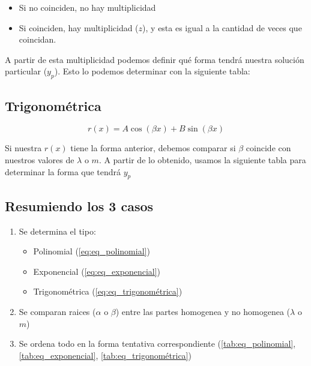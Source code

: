 \begin{itemize}
    \item Si no coinciden, no hay multiplicidad
    \item Si coinciden, hay multiplicidad ($z$), y esta es igual a la cantidad de veces que coincidan. 
\end{itemize}

A partir de esta multiplicidad podemos definir qué forma tendrá nuestra solución particular ($y_{p}$). Esto lo podemos determinar con la siguiente tabla:

    

\subsection{Trigonométrica}

\begin{equation}\label{eq:eq_trigonométrica}
    r(x) = A \cos{(\beta x)} + B \sin{(\beta x)}
\end{equation}

Si nuestra $r(x)$ tiene la forma anterior, debemos comparar si $\beta$ coincide con nuestros valores de $\lambda$ o $m$. A partir de lo obtenido, usamos la siguiente tabla para determinar la forma que tendrá $y_{p}$

    

\subsection{Resumiendo los 3 casos}

\begin{enumerate}
    \item Se determina el tipo:
        \begin{itemize}
            \item Polinomial (\autoref{eq:eq_polinomial})
            \item Exponencial (\autoref{eq:eq_exponencial})
            \item Trigonométrica (\autoref{eq:eq_trigonométrica})
        \end{itemize}
    \item Se comparan raices ($\alpha$ o $\beta$) entre las partes homogenea y no homogenea ($\lambda$ o $m$)
    \item Se ordena todo en la forma tentativa correspondiente (\autoref{tab:eq_polinomial}, \autoref{tab:eq_exponencial}, \autoref{tab:eq_trigonométrica})
\end{enumerate}

